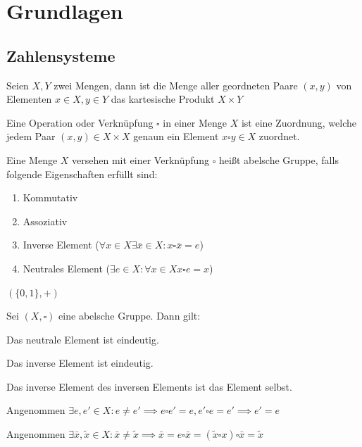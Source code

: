 \section{Grundlagen}
\subsection{Zahlensysteme}
\begin{definition}
	Seien $X, Y$ zwei Mengen, dann ist die Menge aller geordneten Paare $(x,y)$ von Elementen $x \in X, y \in Y$ das kartesische Produkt $X \times Y$
\end{definition}
\begin{definition}
	Eine Operation oder Verknüpfung $\square$ in einer Menge $X$ ist eine Zuordnung, welche jedem Paar $(x,y)\in X\times X$ genaun ein Element $x\square y \in X$ zuordnet.
\end{definition}
\begin{definition}
	Eine Menge $X$ versehen mit einer Verknüpfung $\square$ heißt abelsche Gruppe, falls folgende Eigenschaften erfüllt sind:\begin{enumerate}
		\item Kommutativ
		\item Assoziativ
		\item Inverse Element ($\forall x \in X \exists \bar{x}\in X: x\square \bar{x}=e$)
		\item Neutrales Element ($\exists e \in X: \forall x\in X x\square e =x$)
	\end{enumerate}
\end{definition}
\begin{example}
	$(\{0,1\},+)$
\end{example}
\begin{theorem}
	Sei $(X,\square)$ eine abelsche Gruppe. Dann gilt:\begin{enumerateroman}
		\item Das neutrale Element ist eindeutig.
		\item Das inverse Element ist eindeutig.
		\item Das inverse Element des inversen Elements ist das Element selbst.
	\end{enumerateroman}
\end{theorem}
\prove
\begin{enumerateroman}
	\item Angenommen $\exists e, e' \in X: e\neq e'\implies e\square e'=e, e'\square
		e=e'\implies e'=e$ \lightning
	\item Angenommen $\exists \bar{x},\tilde{x} \in X: \bar{x}\neq\tilde{x}\implies
		\bar{x}=e\square \bar{x}=(\tilde{x}\square x) \square \bar{x}=
		\tilde{x}$\lightning
\end{enumerateroman}
